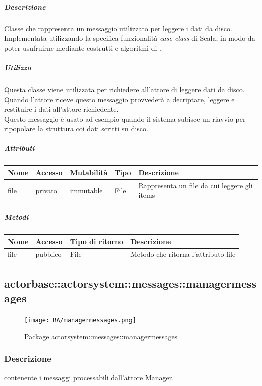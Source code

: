 \documentclass{scalatekids-article}
\begin{document}
\subparagraph{Descrizione}
Classe che rappresenta un messaggio utilizzato per leggere i dati da disco.\\Implementata utilizzando la specifica funzionalità \textit{case class} di Scala,
in modo da poter usufruirne mediante costrutti e algoritmi di
.

\subparagraph{Utilizzo}
Questa classe viene utilizzata per richiedere all'attore di leggere dati
da disco. Quando l'attore riceve questo messaggio provvederà a decriptare,
leggere e restituire i dati all'attore richiedente.\\Questo messaggio è usato ad esempio quando il sistema subisce un riavvio per ripopolare la struttura coi dati scritti su disco.

\subparagraph{Attributi}
\begin{tabular}{| p{2cm} | p{1.5cm} | p{2cm} | p{3cm} | p{8.5cm} |}
  \hline
  Nome & Accesso & Mutabilità & Tipo & Descrizione\\
  \hline
  file & privato & immutable & File & Rappresenta un file da cui leggere gli items\\
  \hline
\end{tabular}

\subparagraph{Metodi}
\begin{tabular}{| p{3cm} | p{1.5cm} | p{3.5cm} | p{9cm} |}
  \hline
  Nome & Accesso & Tipo di ritorno & Descrizione\\
  \hline
  file & pubblico & File & Metodo che ritorna l'attributo file\\
  \hline
\end{tabular}

\subsection{actorbase::actorsystem::messages::managermessages}
\label{sec:actorbase::actorsystem::messages::managermessages}

\begin{figure}[H]
  \begin{center}
    \texttt{[image: RA/managermessages.png]}
    \caption{Package actorsystem::messages::managermessages}
  \end{center}
\end{figure}

\subsubsection{Descrizione}
 contenente i messaggi processabili dall'attore
\hyperref[sec:actorbase::actorsystem::actors::manager::Manager]{Manager}.
\end{document}
